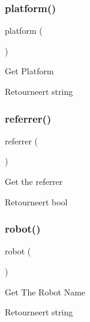 \subsubsection{\texorpdfstring{platform()}{platform()}}
{\footnotesize\ttfamily platform (\begin{DoxyParamCaption}{ }\end{DoxyParamCaption})}

Get Platform

\begin{DoxyReturn}{Retourneert}
string 
\end{DoxyReturn}
\mbox{\label{class_c_i___user__agent_a3a7bdecfe4516d7ce790734ae1449d29}} 
\subsubsection{\texorpdfstring{referrer()}{referrer()}}
{\footnotesize\ttfamily referrer (\begin{DoxyParamCaption}{ }\end{DoxyParamCaption})}

Get the referrer

\begin{DoxyReturn}{Retourneert}
bool 
\end{DoxyReturn}
\mbox{\label{class_c_i___user__agent_a4d6a9230d82ec6fc2fdd6bc57f4da5e5}} 
\subsubsection{\texorpdfstring{robot()}{robot()}}
{\footnotesize\ttfamily robot (\begin{DoxyParamCaption}{ }\end{DoxyParamCaption})}

Get The Robot Name

\begin{DoxyReturn}{Retourneert}
string 
\end{DoxyReturn}
\mbox{\label{class_c_i___user__agent_a6080dae0886626b9a4cedb29240708b1}} 
